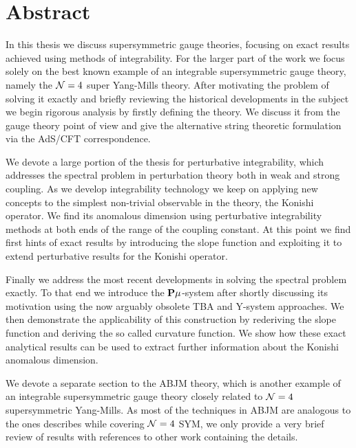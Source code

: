 
\section*{Abstract}

\vspace{30pt}

In this thesis we discuss supersymmetric gauge theories, focusing on exact results achieved using methods of integrability. 
For the larger part of the work we focus solely on the best known example of an integrable supersymmetric gauge theory, namely the $\mathcal{N}=4$ super Yang-Mills theory.
After motivating the problem of solving it exactly and briefly reviewing the historical developments in the subject we begin rigorous analysis by firstly defining the theory. 
We discuss it from the gauge theory point of view and give the alternative string theoretic formulation via the AdS/CFT correspondence.

We devote a large portion of the thesis for perturbative integrability, which addresses the spectral problem in perturbation theory both in weak and strong coupling. 
As we develop integrability technology we keep on applying new concepts to the simplest non-trivial observable in the theory, the Konishi operator.
We find its anomalous dimension using perturbative integrability methods at both ends of the range of the coupling constant.
At this point we find first hints of exact results by introducing the slope function and exploiting it to extend perturbative results for the Konishi operator.

Finally we address the most recent developments in solving the spectral problem exactly.
To that end we introduce the ${\bf P}\mu$-system after shortly discussing its motivation using the now arguably obsolete TBA and Y-system approaches. 
We then demonstrate the applicability of this construction by rederiving the slope function and deriving the so called curvature function.
We show how these exact analytical results can be used to extract further information about the Konishi anomalous dimension. 

We devote a separate section to the ABJM theory, which is another example of an integrable supersymmetric gauge theory closely related to $\mathcal{N}=4$ supersymmetric Yang-Mills. 
As most of the techniques in ABJM are analogous to the ones describes while covering $\mathcal{N}=4$ SYM, we only provide a very brief review of results with references to other work containing the details.
